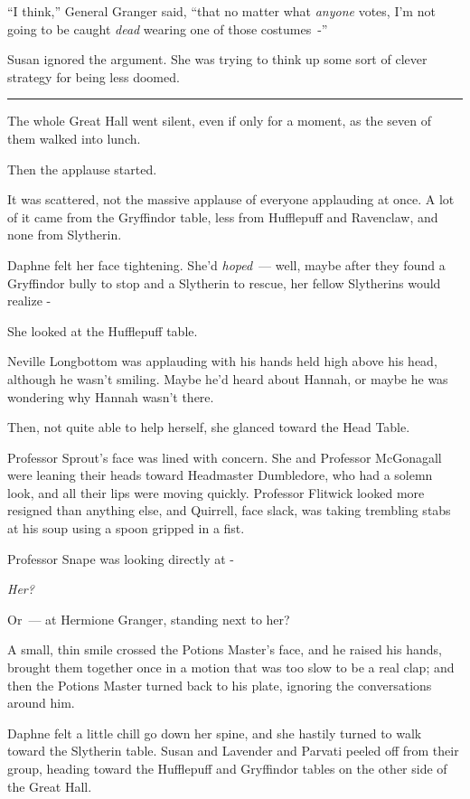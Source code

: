 ``I think,'' General Granger said, ``that no matter what \emph{anyone} votes, I'm not going to be caught \emph{dead} wearing one of those costumes~-''

Susan ignored the argument. She was trying to think up some sort of clever strategy for being less doomed.

\begin{center}\rule{3in}{0.4pt}\end{center}

The whole Great Hall went silent, even if only for a moment, as the seven of them walked into lunch.

Then the applause started.

It was scattered, not the massive applause of everyone applauding at once. A lot of it came from the Gryffindor table, less from Hufflepuff and Ravenclaw, and none from Slytherin.

Daphne felt her face tightening. She'd \emph{hoped}~--- well, maybe after they found a Gryffindor bully to stop and a Slytherin to rescue, her fellow Slytherins would realize -

She looked at the Hufflepuff table.

Neville Longbottom was applauding with his hands held high above his head, although he wasn't smiling. Maybe he'd heard about Hannah, or maybe he was wondering why Hannah wasn't there.

Then, not quite able to help herself, she glanced toward the Head Table.

Professor Sprout's face was lined with concern. She and Professor McGonagall were leaning their heads toward Headmaster Dumbledore, who had a solemn look, and all their lips were moving quickly. Professor Flitwick looked more resigned than anything else, and Quirrell, face slack, was taking trembling stabs at his soup using a spoon gripped in a fist.

Professor Snape was looking directly at -

\emph{Her?}

Or~--- at Hermione Granger, standing next to her?

A small, thin smile crossed the Potions Master's face, and he raised his hands, brought them together once in a motion that was too slow to be a real clap; and then the Potions Master turned back to his plate, ignoring the conversations around him.

Daphne felt a little chill go down her spine, and she hastily turned to walk toward the Slytherin table. Susan and Lavender and Parvati peeled off from their group, heading toward the Hufflepuff and Gryffindor tables on the other side of the Great Hall.

